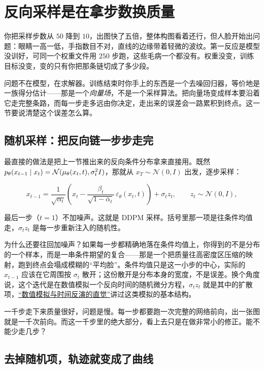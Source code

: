 \section{反向采样是在拿步数换质量}
\label{sec:14-Deep-Learning/08-Diffusion-Models/03}

你把采样步数从 \(50\) 降到 \(10\)，出图快了五倍，整体构图看着还行，但人脸开始出问题：眼睛一高一低，手指数目不对，直线的边缘带着轻微的波纹。第一反应是模型没训好，可同一个权重文件用 \(250\) 步跑，这些毛病一个都没有。权重没变，训练目标没变，变的只有你把那条链切成了多少段。

问题不在模型，在求解器。训练结束时你手上的东西是一个去噪回归器，等价地是一族得分估计——那是一个\emph{向量场}，不是一个采样算法。把向量场变成样本要沿着它走完整条路，而每一步走多远由你决定，走出来的误差会一路累积到终点。这一节要说清楚这个误差怎么算。

\subsection{随机采样：把反向链一步步走完}

最直接的做法是把上一节推出来的反向条件分布拿来直接用。既然 \(p_\theta(x_{t-1}\mid x_t)=\mathcal N(\mu_\theta(x_t,t),\sigma_t^2 I)\)，那就从 \(x_T\sim\mathcal N(0,I)\) 出发，逐步采样：

\[
x_{t-1}=\frac{1}{\sqrt{\alpha_t}}\left(x_t-\frac{\beta_t}{\sqrt{1-\bar\alpha_t}}\,\varepsilon_\theta(x_t,t)\right)+\sigma_t z_t,
\qquad z_t\sim\mathcal N(0,I),
\]

最后一步（\(t=1\)）不加噪声。这就是 DDPM 采样。括号里那一项是往条件均值走，\(\sigma_t z_t\) 是每一步重新注入的随机性。

为什么还要往回加噪声？如果每一步都精确地落在条件均值上，你得到的不是分布的一个样本，而是一串条件期望的复合——那是一个把质量往高密度区压缩的映射，跑到终点会塌成模糊的``平均脸''。条件均值只是这一小步的中心，实际的 \(x_{t-1}\) 应该在它周围按 \(\sigma_t\) 散开；这份散开是分布本身的宽度，不是误差。换个角度说，这个迭代是在数值模拟一个反向时间的随机微分方程，\(\sigma_t z_t\) 就是其中的扩散项，\hyperref[sec:06-Random-Processes/06-Diffusion-and-SDE/04]{``数值模拟与时间反演的直觉''}讲过这类模拟的基本结构。

一千步走下来质量很好，问题是慢。每一步都要跑一次完整的网络前向，出一张图就是一千次前向。而这一千步里的绝大部分，看上去只是在做非常小的修正。能不能少走几步？

\subsection{去掉随机项，轨迹就变成了曲线}

